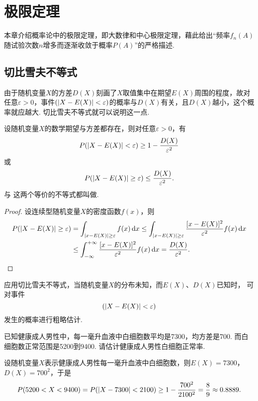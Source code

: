 \chapter{极限定理}
本章介绍概率论中的极限定理，即大数律和中心极限定理，藉此给出“频率\(f_n(A)\)随试验次数\(n\)增多而逐渐收敛于概率\(P(A)\)”的严格描述.

\section{切比雪夫不等式}
由于随机变量\(X\)的方差\(D(X)\)刻画了\(X\)取值集中在期望\(E(X)\)周围的程度，故对任意\(\varepsilon>0\)，事件\((\abs{X - E(X)} < \varepsilon)\)的概率与\(D(X)\)有关，且\(D(X)\)越小，这个概率就应越大.
切比雪夫不等式就可以说明这一点.
\begin{theorem}[切比雪夫不等式]\label{theorem:极限定理.切比雪夫不等式}
设随机变量\(X\)的数学期望与方差都存在，则对任意\(\varepsilon > 0\)，有\begin{equation}\label{equation:极限定理.切比雪夫不等式1}
P(\abs{X-E(X)}<\varepsilon) \geq 1 - \frac{D(X)}{\varepsilon^2}
\end{equation}或\begin{equation}\label{equation:极限定理.切比雪夫不等式2}
P(\abs{X-E(X)}\geq\varepsilon) \leq \frac{D(X)}{\varepsilon^2}.
\end{equation}  与  这两个等价的不等式都叫做.
\begin{proof}
设连续型随机变量\(X\)的密度函数\(f(x)\)，则\begin{align*}
P(\abs{X-E(X)}\geq\varepsilon)
&=\int_{\abs{x-E(X)}\geq\varepsilon} f(x) \dd{x}
\leq \int_{\abs{x-E(X)}\geq\varepsilon} \frac{[x - E(X)]^2}{\varepsilon^2} f(x) \dd{x} \\
&\leq \int_{-\infty}^{+\infty} \frac{[x-E(X)]^2}{\varepsilon^2} f(x) \dd{x}
=\frac{D(X)}{\varepsilon^2}.
\qedhere
\end{align*}
\end{proof}
\end{theorem}

应用切比雪夫不等式，当随机变量\(X\)的分布未知，而\(E(X)\)、\(D(X)\)已知时，%
可对事件\[
(\abs{X-E(X)}<\varepsilon)
\]发生的概率进行粗略估计.

\begin{example}
已知健康成人男性中，每一毫升血液中白细胞数平均是7300，均方差是700.
而白细胞数正常范围是5200到9400.
请估计健康成人男性白细胞正常率.
\begin{solution}
设随机变量\(X\)表示健康成人男性每一毫升血液中白细胞数，则\(E(X) = 7300\)，\(D(X) = 700^2\)，于是\[
P(5200 < X < 9400)
= P(\abs{X - 7300} < 2100)
\geq 1 - \frac{700^2}{2100^2} = \frac{8}{9}
\approx 0.8889.
\]
\end{solution}
\end{example}

